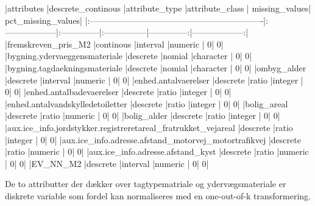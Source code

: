 \documentclass{report}
\begin{document}
\begin{Schunk}
\begin{Soutput}
|attributes                                                    |descrete_continous |attribute_type |attribute_class | missing_values| pct_missing_values|
|:-------------------------------------------------------------|:------------------|:--------------|:---------------|--------------:|------------------:|
|fremskreven_pris_M2                                           |continous          |interval       |numeric         |              0|                  0|
|bygning.ydervaeggensmateriale                                 |descrete           |nomial         |character       |              0|                  0|
|bygning.tagdaekningsmateriale                                 |descrete           |nomial         |character       |              0|                  0|
|ombyg_alder                                                   |descrete           |interval       |numeric         |              0|                  0|
|enhed.antalvaerelser                                          |descrete           |ratio          |integer         |              0|                  0|
|enhed.antalbadevaerelser                                      |descrete           |ratio          |integer         |              0|                  0|
|enhed.antalvandskylledetoiletter                              |descrete           |ratio          |integer         |              0|                  0|
|bolig_areal                                                   |descrete           |ratio          |numeric         |              0|                  0|
|bolig_alder                                                   |descrete           |ratio          |integer         |              0|                  0|
|aux.ice_info.jordstykker.registreretareal_fratrukket_vejareal |descrete           |ratio          |integer         |              0|                  0|
|aux.ice_info.adresse.afstand_motorvej_motortrafikvej          |descrete           |ratio          |numeric         |              0|                  0|
|aux.ice_info.adresse.afstand_kyst                             |descrete           |ratio          |numeric         |              0|                  0|
|EV_NN_M2                                                      |descrete           |interval       |numeric         |              0|                  0|
\end{Soutput}
\end{Schunk}

 
De to attributter der dækker over tagtypematriale og ydervægsmateriale er diskrete variable som fordel kan
normaliseres med en one-out-of-k transformering.
\end{document}
